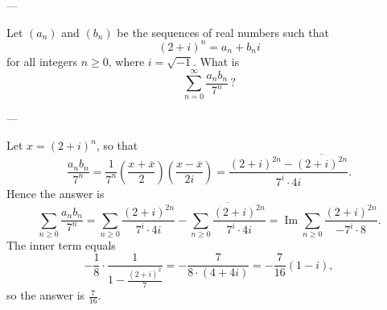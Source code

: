 
---

Let $(a_n)$ and $(b_n)$ be the sequences of real numbers such that \[(2+i)^n=a_n+b_ni\]
for all integers $n\ge0$, where $i=\sqrt{-1}$. What is \[\sum_{n=0}^\infty\frac{a_nb_n}{7^n}\,?\]

---


Let $x=(2+i)^n$, so that\[\frac{a_nb_n}{7^n}=\frac1{7^n}\left(\frac{x+\overline x}2\right)\left(\frac{x-\overline x}{2i}\right)=\frac{(2+i)^{2n}-\overline{(2+i)^{2n}}}{7^i\cdot4i}.\]
Hence the answer is\[\sum_{n\ge0}\frac{a_nb_n}{7^n}=\sum_{n\ge0}\frac{(2+i)^{2n}}{7^i\cdot4i}-\overline{\sum_{n\ge0}\frac{(2+i)^{2n}}{7^i\cdot4i}}=\operatorname{Im}\sum_{n\ge0}\frac{(2+i)^{2n}}{-7^i\cdot8}.\]
The inner term equals\[-\frac18\cdot\frac1{1-\frac{(2+i)^2}7}=-\frac7{8\cdot(4+4i)}=-\frac7{16}(1-i),\]
so the answer is $\tfrac7{16}$.
